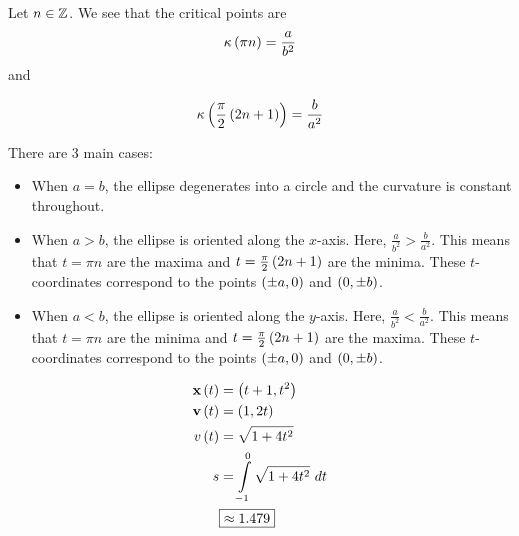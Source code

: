 \documentclass{article}
\begin{document}
Let $n \in \mathbb Z$.
We see that the critical points are
$$
\kappa \left ( \pi n \right) = \frac{a}{b^2}
$$
and

$$
\kappa \left ( \frac{\pi}{2} \left ( 2n+1 \right) \right) = \frac{b}{a^2}
$$

There are 3 main cases:
\begin{itemize}
\item When $a=b$, the ellipse degenerates into a circle and the curvature is constant throughout.
\item When $a>b$, the ellipse is oriented along the $x$-axis.
  Here, $\frac{a}{b^2} > \frac{b}{a^2}$.
  This means that $t=\pi n$ are the maxima and $t = \frac{\pi}{2} \left ( 2n+1 \right)$ are the minima.
  These $t$-coordinates correspond to the points $\left ( \pm a, 0 \right)$ and $\left ( 0, \pm b \right)$.
\item When $a < b$, the ellipse is oriented along the $y$-axis.
  Here, $\frac{a}{b^2} < \frac{b}{a^2}$.
  This means that $t=\pi n$ are the minima and $t = \frac{\pi}{2} \left ( 2n+1 \right)$ are the maxima.
  These $t$-coordinates correspond to the points $\left ( \pm a, 0 \right)$ and $\left ( 0, \pm b \right)$.
\end{itemize}





\begin{align*}
  \textbf{x} \left ( t \right) &= \left ( t+1, t^2 \right) \\
  \textbf{v} \left ( t \right) &= \left ( 1, 2t \right) \\
  v \left ( t \right) &= \sqrt{1+4t^2} \\
  s &= \int \limits_{-1}^{0} \sqrt{1+4t^2}\ dt \\
  & \boxed{\approx 1.479} \\
\end{align*}
\end{document}
